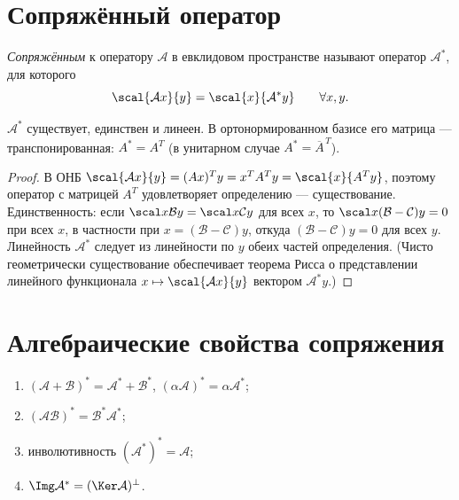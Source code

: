 \section{Сопряжённый оператор}

\begin{definition}
\emph{Сопряжённым} к оператору $\mathcal A$ в евклидовом пространстве называют оператор
$\mathcal A^*$, для которого
\[
  \scal{\mathcal Ax}{y}=\scal{x}{\mathcal A^*y}\qquad\forall x,y .
\]
\end{definition}

\begin{theorem}
$\mathcal A^*$ существует, единствен и линеен. В ортонормированном базисе его матрица —
транспонированная: $A^*=A^{T}$ (в унитарном случае $A^*=\overline{A}^{\,T}$).
\end{theorem}

\begin{proof}
В ОНБ $\scal{\mathcal Ax}{y}=(Ax)^{T}y=x^{T}A^{T}y=\scal{x}{A^{T}y}$, поэтому оператор с матрицей
$A^{T}$ удовлетворяет определению — существование. Единственность: если
$\scal x{\mathcal By}=\scal x{\mathcal Cy}$ для всех $x$, то $\scal x{(\mathcal B-\mathcal C)y}=0$
при всех $x$, в частности при $x=(\mathcal B-\mathcal C)y$, откуда $(\mathcal B-\mathcal C)y=0$ для
всех $y$. Линейность $\mathcal A^*$ следует из линейности по $y$ обеих частей определения. (Чисто
геометрически существование обеспечивает теорема Рисса о представлении линейного функционала
$x\mapsto\scal{\mathcal Ax}{y}$ вектором $\mathcal A^*y$.)
\end{proof}

\section{Алгебраические свойства сопряжения}

\begin{property}\leavevmode
\begin{enumerate}[label=\arabic*),leftmargin=*,nosep]
  \item $(\mathcal A+\mathcal B)^*=\mathcal A^*+\mathcal B^*$, $(\alpha\mathcal A)^*=\alpha\mathcal A^*$;
  \item $(\mathcal A\mathcal B)^*=\mathcal B^*\mathcal A^*$;
  \item инволютивность $(\mathcal A^*)^*=\mathcal A$;
  \item $\Img\mathcal A^*=(\Ker\mathcal A)^\perp$.
\end{enumerate}
\end{property}

